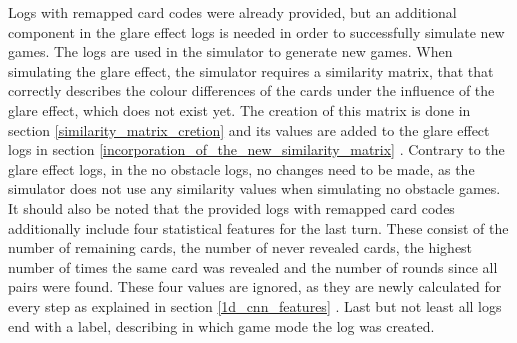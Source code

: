 Logs with remapped card codes were already provided, but an additional component in the glare effect logs is needed in order to successfully simulate new games. The logs are used in the simulator to generate new games. When simulating the glare effect, the simulator requires a similarity matrix, that that correctly describes the colour differences of the cards under the influence of the glare effect, which does not exist yet. The creation of this matrix is done in section \ref{similarity_matrix_cretion}  and its values are added to the glare effect logs in section \ref{incorporation_of_the_new_similarity_matrix} . Contrary to the glare effect logs, in the no obstacle logs, no changes need to be made, as the simulator does not use any similarity values when simulating no obstacle games. It should also be noted that the provided logs with remapped card codes additionally include four statistical features for the last turn. These consist of the number of remaining cards, the number of never revealed cards, the highest number of times the same card was revealed and the number of rounds since all pairs were found. These four values are ignored, as they are newly calculated for every step as explained in section \ref{1d_cnn_features} . Last but not least all logs end with a label, describing in which game mode the log was created. 


